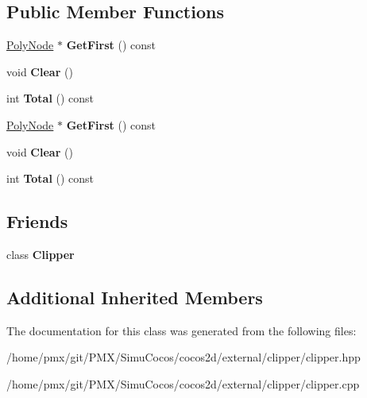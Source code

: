 \subsection*{Public Member Functions}
\begin{DoxyCompactItemize}
\item 
\mbox{\label{classClipperLib_1_1PolyTree_a8b88b8d6225281ee7d536902b0d04e9e}} 
\hyperlink{classClipperLib_1_1PolyNode}{Poly\+Node} $\ast$ {\bfseries Get\+First} () const
\item 
\mbox{\label{classClipperLib_1_1PolyTree_a8620ea631d478b3c43274ac084902ec4}} 
void {\bfseries Clear} ()
\item 
\mbox{\label{classClipperLib_1_1PolyTree_ad0d3c974bab5a30cc8c916da9fe14388}} 
int {\bfseries Total} () const
\item 
\mbox{\label{classClipperLib_1_1PolyTree_a632d915316019da1964ef70f2db7960c}} 
\hyperlink{classClipperLib_1_1PolyNode}{Poly\+Node} $\ast$ {\bfseries Get\+First} () const
\item 
\mbox{\label{classClipperLib_1_1PolyTree_a8620ea631d478b3c43274ac084902ec4}} 
void {\bfseries Clear} ()
\item 
\mbox{\label{classClipperLib_1_1PolyTree_ad0d3c974bab5a30cc8c916da9fe14388}} 
int {\bfseries Total} () const
\end{DoxyCompactItemize}
\subsection*{Friends}
\begin{DoxyCompactItemize}
\item 
\mbox{\label{classClipperLib_1_1PolyTree_a45ad8a460adf59bb3701c703cc85bd11}} 
class {\bfseries Clipper}
\end{DoxyCompactItemize}
\subsection*{Additional Inherited Members}


The documentation for this class was generated from the following files\+:\begin{DoxyCompactItemize}
\item 
/home/pmx/git/\+P\+M\+X/\+Simu\+Cocos/cocos2d/external/clipper/clipper.\+hpp\item 
/home/pmx/git/\+P\+M\+X/\+Simu\+Cocos/cocos2d/external/clipper/clipper.\+cpp\end{DoxyCompactItemize}

